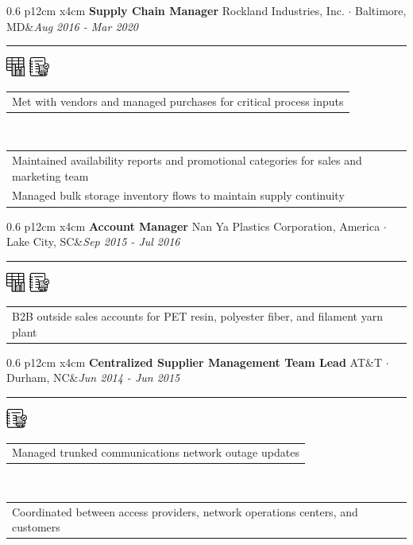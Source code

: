\documentclass[10pt,A4]{article}
\newcommand{\tzlarrow}{(0,0) -- (0.2,0) -- (0.3,0.2) -- (0.2,0.4) -- (0,0.4) -- (0.1,0.2) -- cycle;}
\newcommand{\larrow}[1]
{\begin{tikzpicture}[scale=0.58]
	 \filldraw[fill=#1!100,draw=#1!100!black]  \tzlarrow
 \end{tikzpicture}
}
\newcommand{\cvevent}[5]
{
\vspace{8pt}
	\begin{tabular*}{0.6\linewidth}{ p{12cm} x{4cm}}
\textbf{#2} \hspace{4pt} {#3}&\textit{#1}\\[4pt]
	\end{tabular*}
        
        \vspace{-6pt}

\textcolor{softcol}{\hrule}
\vspace{-2pt}
\hspace{14.3cm}
#4 \\[-18pt-6pt]
\vspace{6pt}
	\begin{tabular*}{1\textwidth}{l}
	\vspace{-0.85cm} \larrow{sectcol} #5\\[4.5pt]
	\end{tabular*}
}
\newcommand{\cveventshort}[5]
{
\vspace{8pt}
	\begin{tabular*}{0.6\linewidth}{ p{12cm} x{4cm}}
\textbf{#2} \hspace{4pt} {#3}&\textit{#1}\\[4pt]
	\end{tabular*}
        
        \vspace{-6pt}
       
\textcolor{softcol}{\hrule}
\vspace{-2pt}
\hspace{14.3cm}
#4 \\[-18pt-6pt]
\vspace{6pt}
	\begin{tabular*}{1\textwidth}{l}
	\vspace{-0.85cm} \larrow{sectcol} #5\\[6pt]
	\end{tabular*}
\vspace{-3pt}
}
\newcommand{\oneextra}[1]
{ \vspace{-0.85cm+24pt} \\
\begin{tabular*}{1\textwidth}{l}
		 \larrow{softcol}  #1\\[6pt]
	\end{tabular*}
\vspace{-3pt}
}
\newcommand{\twoextra}[2]
{ \vspace{-0.85cm+24pt} \\
\begin{tabular*}{1\textwidth}{l}
		 \larrow{softcol}  #1\\[4.5pt]
		 \larrow{softcol}  #2\\[6pt]
	\end{tabular*}
\vspace{-3pt}
}
\begin{document}
\begin{minipage}[c][0.5\textheight][t]{\linewidth}
{%

%
  \cvevent{Aug 2016 - Mar 2020}{Supply Chain Manager}{Rockland Industries, Inc.  $\cdot$  Baltimore, MD}
{ \hspace{20.2222pt} \includegraphics[height=18pt]{img/chartgraphic} \hspace{2pt} \includegraphics[height=18pt]{img/notebookgraphic}}
{Met with vendors and managed purchases for critical process inputs}
  \twoextra{Maintained availability reports and promotional categories for sales and marketing team}{Managed bulk storage inventory flows to maintain supply continuity}


%
  \cveventshort{Sep 2015 - Jul 2016}{Account Manager}{Nan Ya Plastics Corporation, America  $\cdot$  Lake City, SC}
{ \hspace{20.2222pt} \includegraphics[height=18pt]{img/chartgraphic} \hspace{2pt} \includegraphics[height=18pt]{img/notebookgraphic}}
{B2B outside sales accounts for PET resin, polyester fiber, and filament yarn plant}



%
  \cvevent{Jun 2014 - Jun 2015}{Centralized Supplier Management Team Lead}{AT\&T  $\cdot$  Durham, NC}
{ \hspace{45.2222pt}  \includegraphics[height=18pt]{img/notebookgraphic}}
{Managed trunked communications network outage updates}
  \oneextra{Coordinated between access providers, network operations centers, and customers}
}

\end{minipage} \\ [24pt]
\end{document}
